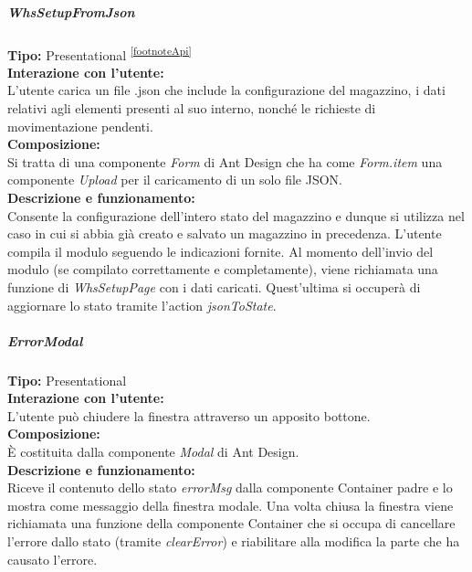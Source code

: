 \subparagraph{\colorbox{verde_uml}{WhsSetupFromJson}} 
\textbf{Tipo:} Presentational \textsuperscript{\ref{footnoteApi}} \\
\textbf{Interazione con l'utente:} \\
L'utente carica un file .json che include la configurazione del magazzino, i dati relativi agli elementi presenti al suo interno, nonché le richieste di movimentazione pendenti. \\
\textbf{Composizione:} \\
Si tratta di una componente \textit{Form} di Ant Design che ha come \textit{Form.item} una componente \textit{Upload} per il caricamento di un solo file JSON. \\
\textbf{Descrizione e funzionamento:} \\
Consente la configurazione dell'intero stato del magazzino e dunque si utilizza nel caso in cui si abbia già creato e salvato un magazzino in precedenza.
L'utente compila il modulo seguendo le indicazioni fornite. Al momento dell'invio del modulo (se compilato correttamente e completamente), viene richiamata una funzione di \textit{WhsSetupPage} con i dati caricati. Quest'ultima si occuperà di aggiornare lo stato tramite l'action \textit{jsonToState}.

\subparagraph{\colorbox{verde_uml}{ErrorModal}}\label{errorModal}
\textbf{Tipo:} Presentational \\
\textbf{Interazione con l'utente:} \\
L'utente può chiudere la finestra attraverso un apposito bottone.\\
\textbf{Composizione:} \\
È costituita dalla componente \textit{Modal} di Ant Design. \\
\textbf{Descrizione e funzionamento:} \\
Riceve il contenuto dello stato \textit{errorMsg} dalla componente Container padre e lo mostra come messaggio della finestra modale. Una volta chiusa la finestra viene richiamata una funzione della componente Container che si occupa di cancellare l'errore dallo stato (tramite \textit{clearError}) e riabilitare alla modifica la parte che ha causato l'errore.

